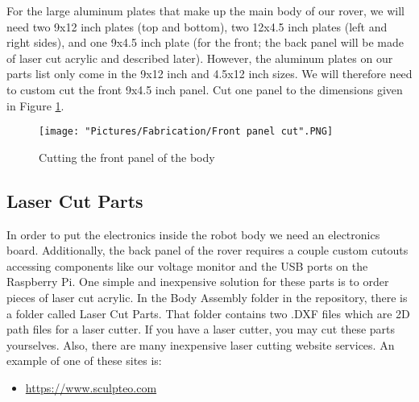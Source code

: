 \documentclass[12pt]{article}
\begin{document}
For the large aluminum plates that make up the main body of our rover, we will need two 9x12 inch plates (top and bottom),  two 12x4.5 inch plates (left and right sides), and one 9x4.5 inch plate (for the front; the back panel will be made of laser cut acrylic and described later).  However, the aluminum plates on our parts list only come in the 9x12 inch and 4.5x12 inch sizes.  We will therefore need to custom cut the front 9x4.5 inch panel.  Cut one panel to the dimensions given in  Figure \ref{fb panel cut}.



\begin{figure}[H]
	\centering
	\texttt{[image: "Pictures/Fabrication/Front panel cut".PNG]}
  	\caption{Cutting the front panel of the body}
  	\label{fb panel cut}
\end{figure}


\subsection{Laser Cut Parts}

In order to put the electronics inside the robot body we need an electronics board.  Additionally, the back panel of the rover requires a couple custom cutouts accessing components like our voltage monitor and the USB ports on the Raspberry Pi. One simple and inexpensive solution for these parts is to order pieces of laser cut acrylic. In the Body Assembly folder in the repository, there is a folder called Laser Cut Parts. That folder contains two .DXF files which are 2D path files for a laser cutter.  If you have a laser cutter, you may cut these parts yourselves.  Also, there are many inexpensive laser cutting website services. An example of one of these sites is:

\begin{itemize}
	\item \href{https://www.sculpteo.com}{https://www.sculpteo.com}
\end{itemize}
\end{document}
